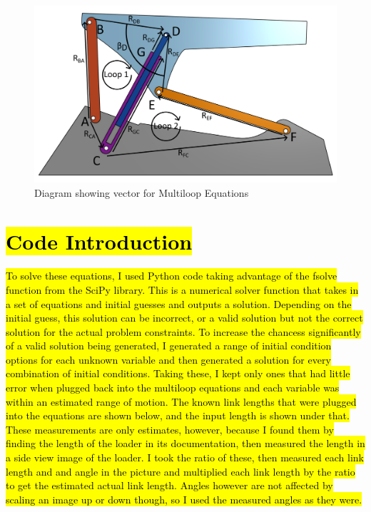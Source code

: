 \documentclass[hidelinks]{article}
\begin{document}
    \begin{figure}[ht]
        \centering
        \includegraphics[width=1\linewidth]{MultiLoopClosureAnnotated.png}
        \caption{Diagram showing vector for Multiloop Equations}\label{fig:multiloop}
    \end{figure}
    \FloatBarrier\section*{\hl{Code Introduction}}
    \hl{To solve these equations, I used Python code taking advantage of the fsolve function from the SciPy library. This is a numerical solver function that takes in a set of equations and initial guesses and outputs a solution. Depending on the initial guess, this solution can be incorrect, or a valid solution but not the correct solution for the actual problem constraints. To increase the chancess significantly of a valid solution being generated, I generated a range of initial condition options for each unknown variable and then generated a solution for every combination of initial conditions. Taking these, I kept only ones that had little error when plugged back into the multiloop equations and each variable was within an estimated range of motion. The known link lengths that were plugged into the equations are shown below, and the input length is shown under that. These measurements are only estimates, however, because I found them by finding the length of the loader in its documentation, then measured the length in a side view image of the loader. I took the ratio of these, then measured each link length and and angle in the picture and multiplied each link length by the ratio to get the estimated actual link length. Angles however are not affected by scaling an image up or down though, so I used the measured angles as they were.}
\end{document}
